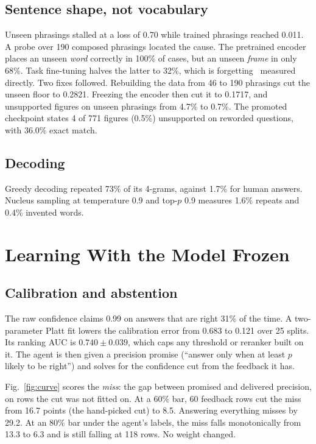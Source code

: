 \documentclass[conference]{IEEEtran}
\begin{document}
\subsection{Sentence shape, not vocabulary}
Unseen phrasings stalled at a loss of 0.70 while trained phrasings reached 0.011. A probe over 190
composed phrasings located the cause. The pretrained encoder places an unseen \emph{word} correctly
in 100\% of cases, but an unseen \emph{frame} in only 68\%. Task fine-tuning halves the latter to
32\%, which is forgetting~\cite{Luo_2025} measured directly. Two fixes followed. Rebuilding the data
from 46 to 190 phrasings cut the unseen floor to 0.2821. Freezing the encoder then cut it to 0.1717,
and unsupported figures on unseen phrasings from 4.7\% to 0.7\%. The promoted checkpoint states
4 of 771 figures (0.5\%) unsupported on reworded questions, with 36.0\% exact match.

\subsection{Decoding}
Greedy decoding repeated 73\% of its 4-grams, against 1.7\% for human answers. Nucleus sampling at
temperature 0.9 and top-$p$ 0.9 measures 1.6\% repeats and 0.4\% invented words.

\section{Learning With the Model Frozen}
\label{sec:policy}
\subsection{Calibration and abstention}
The raw confidence claims 0.99 on answers that are right 31\% of the time. A two-parameter Platt fit
lowers the calibration error from 0.683 to 0.121 over 25 splits. Its ranking AUC is $0.740 \pm 0.039$,
which caps any threshold or reranker built on it. The agent is then given a precision promise
(``answer only when at least $p$ likely to be right'') and solves for the confidence cut from the
feedback it has.

Fig.~\ref{fig:curve} scores the \emph{miss}: the gap between promised and delivered precision, on rows
the cut was not fitted on. At a 60\% bar, 60 feedback rows cut the miss from 16.7 points (the
hand-picked cut) to 8.5. Answering everything misses by 29.2. At an 80\% bar under the agent's labels,
the miss falls monotonically from 13.3 to 6.3 and is still falling at 118 rows. No weight changed.
\end{document}
